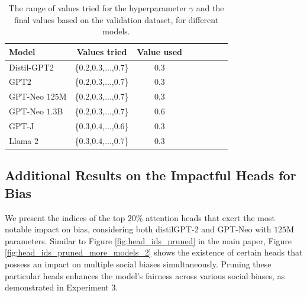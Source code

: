 \documentclass[letterpaper]{article} %
\begin{document}
\begin{table}[h] 
\centering
\begin{tabular}{lcclllll}
\hline
 \textbf{Model} & \textbf{Values tried} & \textbf{Value used}\\
\hline
\centering

         Distil-GPT2        &  \{$0.2$,$0.3$,...,$0.7$\}    &$0.3$ &\\
         GPT2                &  \{$0.2$,$0.3$,...,$0.7$\}    &$0.3$ &\\
         GPT-Neo $125$M        &  \{$0.2$,$0.3$,...,$0.7$\}    &$0.3$ &\\
         GPT-Neo $1.3$B        &  \{$0.2$,$0.3$,...,$0.7$\}    &$0.6$ &\\
         GPT-J       &  \{$0.3$,$0.4$,...,$0.6$\}    &$0.3$ &\\
         Llama $2$          &  \{$0.3$,$0.4$,...,$0.7$\}    &$0.3$ &\\
         \hline

\end{tabular}
\caption{The range of values tried for the hyperparameter $\gamma $ and the final values based on the validation dataset, for different models.
}
\label{tab:hyperparamaters}
\end{table}





\subsection{Additional Results on the Impactful Heads for Bias}

We present the indices of the top $20\%$ attention heads that exert the most notable impact on bias, considering both distilGPT-2 and GPT-Neo with $125$M parameters. Similar to Figure \ref{fig:head_ids_pruned} in the main paper, Figure \ref{fig:head_ids_pruned_more_models_2} shows the existence of certain heads that possess an impact on multiple social biases simultaneously. Pruning these particular heads enhances the model's fairness across various social biases, as demonstrated in Experiment 3.
\end{document}
